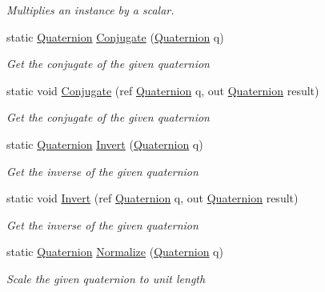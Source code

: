 \begin{DoxyCompactItemize}
\begin{DoxyCompactList}\small\item\em Multiplies an instance by a scalar. \end{DoxyCompactList}\item 
static \hyperlink{struct_open_t_k_1_1_quaternion}{Quaternion} \hyperlink{struct_open_t_k_1_1_quaternion_a8284d69ce3125f7509a25ebb4adc8563}{Conjugate} (\hyperlink{struct_open_t_k_1_1_quaternion}{Quaternion} q)
\begin{DoxyCompactList}\small\item\em Get the conjugate of the given quaternion \end{DoxyCompactList}\item 
static void \hyperlink{struct_open_t_k_1_1_quaternion_a5a1b50899ba3ed87e585615060233f39}{Conjugate} (ref \hyperlink{struct_open_t_k_1_1_quaternion}{Quaternion} q, out \hyperlink{struct_open_t_k_1_1_quaternion}{Quaternion} result)
\begin{DoxyCompactList}\small\item\em Get the conjugate of the given quaternion \end{DoxyCompactList}\item 
static \hyperlink{struct_open_t_k_1_1_quaternion}{Quaternion} \hyperlink{struct_open_t_k_1_1_quaternion_a482789e5f1cdc692474c1465095d00c3}{Invert} (\hyperlink{struct_open_t_k_1_1_quaternion}{Quaternion} q)
\begin{DoxyCompactList}\small\item\em Get the inverse of the given quaternion \end{DoxyCompactList}\item 
static void \hyperlink{struct_open_t_k_1_1_quaternion_a2dadba34c0cdc6f578215cc78c184694}{Invert} (ref \hyperlink{struct_open_t_k_1_1_quaternion}{Quaternion} q, out \hyperlink{struct_open_t_k_1_1_quaternion}{Quaternion} result)
\begin{DoxyCompactList}\small\item\em Get the inverse of the given quaternion \end{DoxyCompactList}\item 
static \hyperlink{struct_open_t_k_1_1_quaternion}{Quaternion} \hyperlink{struct_open_t_k_1_1_quaternion_a522236c79e456951f8b1927265e8752f}{Normalize} (\hyperlink{struct_open_t_k_1_1_quaternion}{Quaternion} q)
\begin{DoxyCompactList}\small\item\em Scale the given quaternion to unit length \end{DoxyCompactList}\item 

\end{DoxyCompactItemize}
